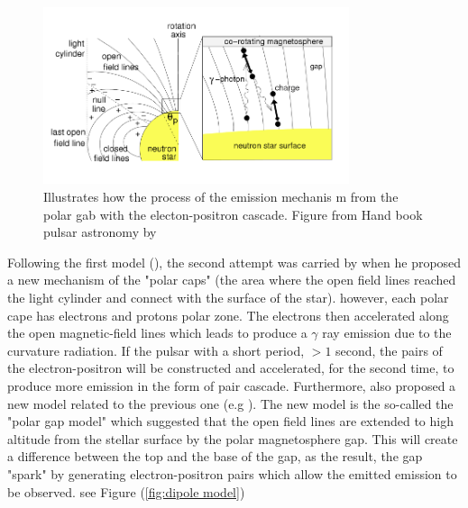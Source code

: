 \begin{figure}[H] 
\centering    
\includegraphics[width=0.8\textwidth]{JLmodel.png}
\caption[The Goldreich-Julian Model
Goldreich]{Illustrates how the process of the emission mechanis
m from the polar gab with the electon-positron cascade.
Figure from Hand book pulsar astronomy by \citet{lorimer2005handbook} }
\label{fig:dipole model1}
\end{figure}

Following the first model (\citet{goldreich1969pulsar}), the second attempt was carried by \citet{sturrock1971model} when he proposed a new mechanism of the "polar caps" (the area where the open field lines reached the light cylinder and connect with the surface of the star). however, each polar cape has electrons and protons polar zone. The electrons then accelerated along the open magnetic-field lines which leads to produce a $\gamma$ ray emission due to the curvature radiation. If the pulsar with a short period, $> 1$ second, the pairs of the electron-positron will be constructed and accelerated, for the second time, to produce more emission in the form of pair cascade. Furthermore, \citet{ruderman1975theory} also proposed a new model related to the previous one (e.g \citet{sturrock1971model}). The new model is the so-called the "polar gap model" which suggested that the open field lines are extended to high altitude from the stellar surface by the polar magnetosphere gap. This will create a difference between the top and the base of the gap, as the result, the gap "spark" by generating electron-positron pairs which allow the emitted emission to be observed. see Figure (\ref{fig:dipole model})

